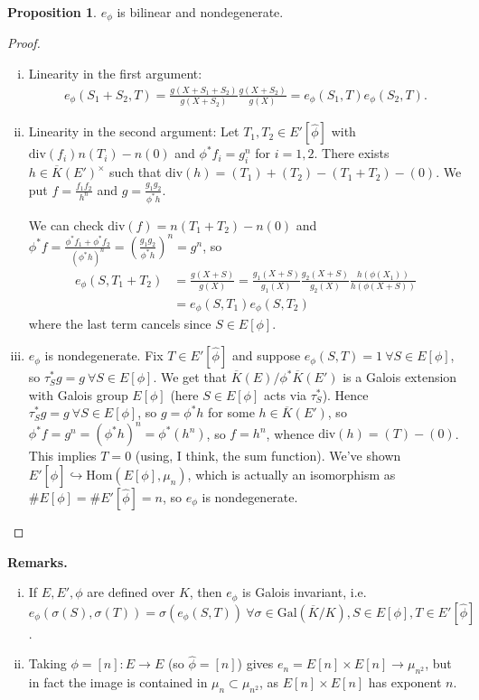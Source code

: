 \documentclass{article}
\theoremstyle{definition}
\newtheorem{prop}[theorem]{Proposition}
\begin{document}
\begin{prop}\label{prop14.5}
    $e_\phi$ is bilinear and nondegenerate.
\end{prop}
\begin{proof}
    \begin{enumerate}[(i)]
        \item Linearity in the first argument:
        \begin{align*}
            e_\phi(S_1+S_2,T) = \frac{g(X+S_1+S_2)}{g(X+S_2)}\frac{g(X+S_2)}{g(X)} =e_\phi(S_1,T)e_\phi(S_2,T).
        \end{align*}
        \item Linearity in the second argument: Let $T_1,T_2 \in E'[\widehat{\phi}]$ with $\text{div}(f_i)n(T_i)-n(0)$ and $\phi^* f_i = g_i^n$ for $i=1,2$. There exists $h \in \overline{K}(E')^\times$ such that $\text{div}(h)=(T_1)+(T_2)-(T_1+T_2)-(0)$. We put $f = \frac{f_1f_2}{h^n}$ and $g = \frac{g_1g_2}{\phi^*h}$.
        \vspace{1mm}
         
        We can check $\text{div}(f) = n(T_1+T_2)-n(0)$ and $\phi^* f = \frac{\phi^* f_1 + \phi^* f_2}{(\phi^* h)^n} = \left(\frac{g_1g_2}{\phi^* h}\right)^n = g^n$, so 
        \begin{align*}
            e_{\phi}(S,T_1+T_2) &= \frac{g(X+S)}{g(X)} = \frac{g_1(X+S)}{g_1(X)}\frac{g_2(X+S)}{g_2(X)}\frac{h(\phi(X_1))}{h(\phi(X+S))} \\&= e_\phi(S,T_1)e_{\phi}(S,T_2)
        \end{align*}
        where the last term cancels since $S \in E[\phi]$.
        \item $e_\phi$ is nondegenerate. Fix $T \in E'[\widehat{\phi}]$ and suppose $e_\phi(S,T)=1 ~\forall S \in E[\phi]$, so $\tau_S^*g = g ~\forall S \in E[\phi]$. We get that $\overline{K}(E)/\phi^*\overline{K}(E')$ is a Galois extension with Galois group $E[\phi]$ (here $S \in E[\phi]$ acts via $\tau_S^*$). Hence $\tau_S^*g = g ~\forall S \in E[\phi]$, so $g = \phi^* h$ for some $h \in \overline{K}(E')$, so $\phi^* f = g^n = (\phi^* h)^n = \phi^*(h^n)$, so $f = h^n$, whence $\text{div}(h)=(T)-(0)$. This implies $T=0$ (using, I think, the sum function). We've shown $E'[\widehat{\phi}] \hookrightarrow \text{Hom}(E[\phi],\mu_n)$, which is actually an isomorphism as $\# E[\phi] = \# E'[\widehat{\phi}] = n$, so $e_\phi$ is nondegenerate.
    \end{enumerate}
\end{proof}
\textbf{Remarks.}
\begin{enumerate}[(i)]
    \item If $E,E',\phi$ are defined over $K$, then $e_\phi$ is Galois invariant, i.e. $e_\phi(\sigma(S),\sigma(T))=\sigma(e_\phi(S,T)) ~\forall \sigma \in \text{Gal}(\overline{K}/K), S \in E[\phi], T \in E'[\widehat{\phi}]$.
    \item Taking $\phi = [n]:E \to E$ (so $\widehat{\phi} = [n]$) gives $e_n = E[n] \times E[n] \to \mu_{n^2}$, but in fact the image is contained in $\mu_n \subset \mu_{n^2}$, as $E[n]\times E[n]$ has exponent $n$.
\end{enumerate} 
\end{document}
